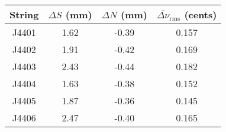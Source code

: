 \begin{tabular}{cccc}
\toprule
String & $\Delta S$ (mm) & $\Delta N$ (mm) & $\overline{\Delta \nu}_\text{rms}$ (cents) \\
\midrule
J4401 & 1.62 & -0.39 & 0.157 \\
J4402 & 1.91 & -0.42 & 0.169 \\
J4403 & 2.43 & -0.44 & 0.182 \\
J4404 & 1.63 & -0.38 & 0.152 \\
J4405 & 1.87 & -0.36 & 0.145 \\
J4406 & 2.47 & -0.40 & 0.165 \\
\bottomrule
\end{tabular}
